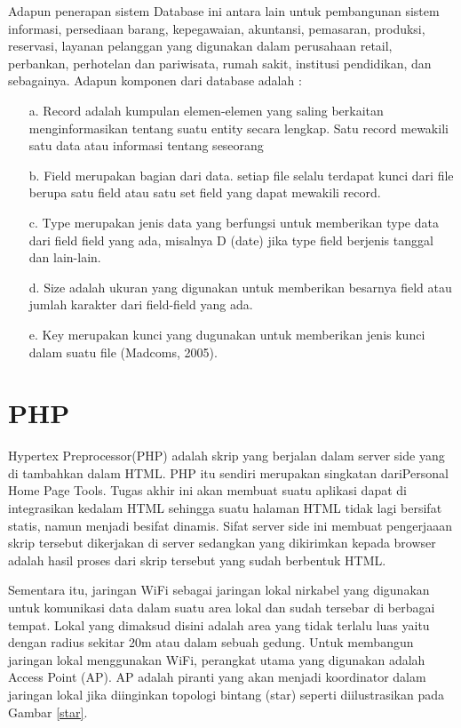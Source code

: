 \documentclass{jtetiproposalskripsi}
\begin{document}
Adapun penerapan sistem Database ini antara lain untuk  pembangunan sistem informasi, persediaan barang, kepegawaian, akuntansi, pemasaran, produksi, reservasi, layanan pelanggan yang digunakan dalam perusahaan retail, perbankan, perhotelan dan  pariwisata, rumah sakit, institusi pendidikan, dan sebagainya. Adapun komponen dari database adalah :
\begin{itemize}


\item[a.] Record adalah kumpulan elemen-elemen yang saling berkaitan menginformasikan tentang suatu entity secara lengkap. Satu record mewakili satu data atau informasi tentang seseorang 
 \item[b.] Field merupakan bagian dari data. setiap file selalu terdapat kunci dari file berupa satu field atau satu set field yang dapat mewakili record. 
\item[c.] Type merupakan jenis data yang berfungsi untuk memberikan type data dari field field yang ada, misalnya D (date) jika type field berjenis tanggal dan lain-lain.
 \item[d.] Size adalah ukuran yang digunakan untuk memberikan besarnya field atau jumlah karakter dari field-field yang ada. 
\item[e.] Key merupakan kunci yang dugunakan untuk memberikan jenis kunci dalam suatu file (Madcoms, 2005).
\end{itemize}
\section{PHP}
Hypertex Preprocessor(PHP) adalah skrip yang berjalan dalam
 server  side yang di tambahkan dalam HTML. PHP itu sendiri merupakan singkatan dariPersonal Home Page Tools. Tugas akhir  ini akan membuat suatu aplikasi dapat di integrasikan kedalam HTML sehingga suatu halaman HTML tidak lagi bersifat statis, namun menjadi besifat dinamis. Sifat server side ini membuat pengerjaaan skrip tersebut dikerjakan di server sedangkan yang dikirimkan kepada browser adalah hasil proses dari skrip tersebut yang sudah berbentuk HTML.

Sementara itu, jaringan WiFi sebagai jaringan lokal nirkabel yang digunakan untuk komunikasi data dalam suatu area lokal dan sudah tersebar di berbagai tempat. Lokal yang dimaksud disini adalah area yang tidak terlalu luas yaitu dengan radius sekitar 20m atau dalam sebuah gedung. Untuk membangun jaringan lokal menggunakan WiFi, perangkat utama yang digunakan adalah Access Point (AP). AP adalah piranti yang akan menjadi koordinator dalam jaringan lokal jika diinginkan topologi bintang (star) seperti diilustrasikan pada Gambar \ref{star}.
\end{document}
